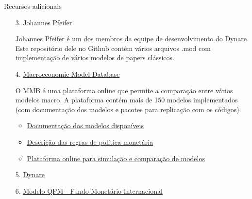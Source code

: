 \documentclass[10pt]{beamer}
\begin{document}
\begin{frame}{Recursos adicionais}
    \begin{enumerate}
        \item[3.] \href{https://github.com/JohannesPfeifer/DSGE_mod}{Johannes Pfeifer}\medskip
        
        Johannes Pfeifer é um dos membros da equipe de desenvolvimento do Dynare. Este repositório dele no Github contém vários arquivos .mod com implementação de vários modelos de papers clássicos.\medskip

        \item[4.] \href{https://www.macromodelbase.com/}{Macroeconomic Model Database}
        
        O MMB é uma plataforma online que permite a comparação entre vários modelos macro. A plataforma contém mais de 150 modelos implementados (com documentação dos modelos e pacotes para replicação com os códigos).\medskip
        \begin{itemize}
            \item \href{https://www.macromodelbase.com/files/documentation_source/mmb-model-description.pdf}{Documentação dos modelos disponíveis}\medskip
            \item \href{https://www.macromodelbase.com/files/mmb-mprule-description.pdf}{Descrição das regras de política monetária}\medskip            
            \item \href{https://ocp.macromodelbase.com/}{Plataforma online para simulação e comparação de modelos}\medskip           
        \end{itemize}

        \item[5.] \href{https://www.dynare.org/}{Dynare}\medskip
        \item[6.] \href{https://www.imf.org/en/Capacity-Development/Training/ICDTC/Courses/MPAFx}{Modelo QPM - Fundo Monetário Internacional} 
    \end{enumerate}
\end{frame}
\end{document}
